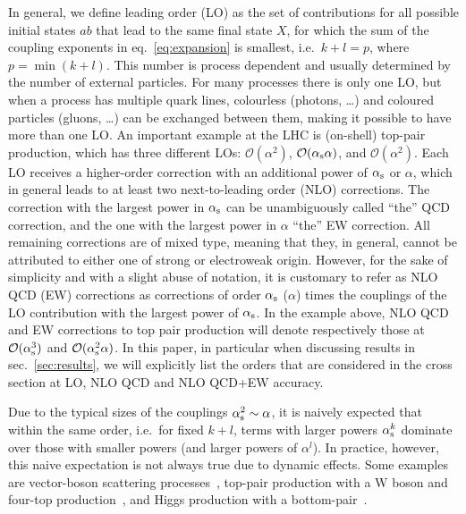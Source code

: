 In general, we define leading order (LO) as the set of contributions for all possible initial states $a b$ that lead to the same final state $X$, for which the sum of the coupling exponents in eq.~\eqref{eq:expansion} is smallest, i.e.\ $k + l = p$, where $p = \min (k+l)$.
This number is process dependent and usually determined by the number of external particles.
For many processes there is only one LO, but when a process has multiple quark lines, colourless (photons, \dots) and coloured particles (gluons, \ldots) can be exchanged between them, making it possible to have more than one LO.
An important example at the LHC is (on-shell) top-pair production, which has three different LOs: $\mathcal{O} (\alpha^2)$, $\mathcal{O} (\alpha_\mathrm{s} \alpha)$, and $\mathcal{O} (\alpha^2)$.
Each LO receives a higher-order correction with an additional power of $\alpha_\mathrm{s}$ or $\alpha$, which in general leads to at least two next-to-leading order (NLO) corrections.
The correction with the largest power in $\alpha_\mathrm{s}$ can be unambiguously called \enquote{the} QCD correction, and the one with the largest power in $\alpha$ \enquote{the} EW correction.
All remaining corrections are of mixed type, meaning that they, in general, cannot be attributed to either one of strong or electroweak origin. However, for the sake of simplicity and with a slight abuse of notation, it is customary to refer 
as NLO QCD (EW) corrections as
corrections of order $\alpha_\mathrm{s}$ ($\alpha$) times the couplings of the LO contribution 
with the largest power of $\alpha_\mathrm{s}$. In the example above, NLO QCD and EW corrections to top pair production will denote
respectively those at $\mathcal{O} (\alpha_\mathrm{s}^3 )$ and $\mathcal{O} (\alpha_\mathrm{s}^2 \alpha)$. In this paper, in particular
when discussing results in sec.~\ref{sec:results}, we will explicitly list the orders that are considered in the cross
section at LO, NLO QCD and NLO QCD+EW accuracy.

Due to the typical sizes of the couplings $\alpha_\mathrm{s}^2 \sim \alpha$, it is naively expected that within the same order, i.e.\ for fixed $k + l$, terms with larger powers $\alpha_\mathrm{s}^k$ dominate over those with smaller powers (and larger powers of $\alpha^l$).
In practice, however, this naive expectation is not always true due to dynamic effects.
Some examples are vector-boson scattering processes~\cite{Biedermann:2017bss,Denner:2019tmn}, top-pair production with a W boson and four-top production~\cite{Frederix:2017wme}, and Higgs production with a bottom-pair~\cite{Pagani:2020rsg}.

